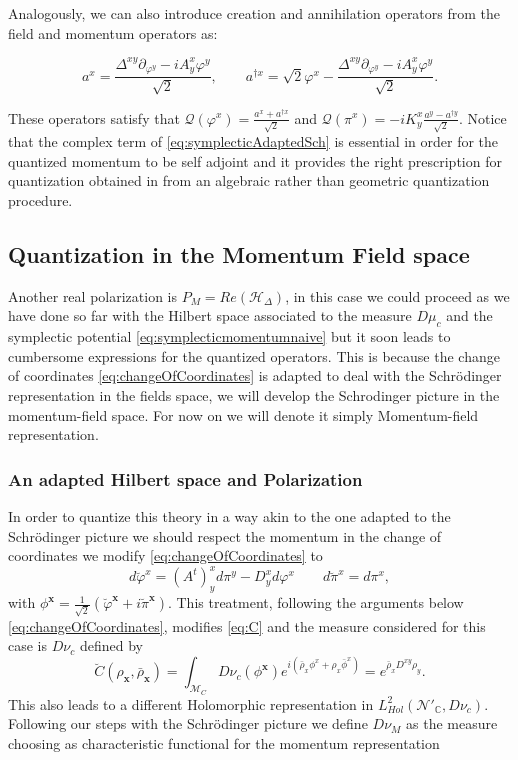 \documentclass[12pt]{article}%
\begin{document}
Analogously, we can also introduce creation and annihilation operators from the field and momentum operators as:

\begin{equation}
\label{eq:crationannihilation}
a^x= \frac{\Delta^{xy}\partial_{\varphi^y}-iA^x_{y}\varphi^y}{\sqrt{2}}, \qquad a^{\dagger x}=\sqrt{2}\varphi^x-\frac{\Delta^{xy}\partial_{\varphi^y}-iA^x_{y}\varphi^y}{\sqrt{2}}.
\end{equation}

These operators satisfy that  $\mathcal{Q}(\varphi^x)= \frac{a^x+a^{\dagger x}}{\sqrt2}$ and $\mathcal{Q}(\pi^x)= -iK^x_{y}\frac{a^y-a^{\dagger y}}{\sqrt2}$.
Notice that the complex term of \eqref{eq:symplecticAdaptedSch} is essential in order for the quantized momentum to be self adjoint  and it provides the right prescription for quantization   
 obtained in \cite{Corichi2004} from an algebraic rather than geometric quantization procedure. 
\subsection{Quantization in the Momentum Field space}
Another real polarization is $P_M=Re(\mathcal{H}_\Delta)$, in this case we could proceed as we have done so far with the Hilbert space associated to the measure $D\mu_c$ and the symplectic potential \eqref{eq:symplecticmomentumnaive} but it soon leads to cumbersome expressions for the quantized operators. This is because the change of coordinates \eqref{eq:changeOfCoordinates} is adapted to deal with the Schrödinger representation in the fields space, we will develop the Schrodinger picture in the momentum-field space. For now on we will denote it simply Momentum-field representation.  
\subsubsection{An adapted Hilbert space and Polarization }
 In order to quantize this theory in a way akin to the one adapted to the Schrödinger picture we should respect the momentum in the change of coordinates we modify  \eqref{eq:changeOfCoordinates}  to  
$$d{\breve{\varphi}^x}=(A^t)^x_yd\pi^y-D^x_yd{\varphi^x} \qquad{d\breve{\pi}^x}=d{\pi^x},$$
with $\phi^\mathbf{x}=\frac{1}{\sqrt2}(\breve\varphi^\mathbf{x}+i\breve\pi^\mathbf{x})$. This treatment, following the arguments below  \eqref{eq:changeOfCoordinates}, modifies \eqref{eq:C} and  the measure considered for this case is $D\nu_c$ defined by
\begin{equation}
    \label{eq:gaussianmeasuremomentum}
    \breve{C}(\rho_{\mathbf{x}}, \bar \rho_{\mathbf{x}})=\int_{\mathcal{M}_C}D\nu_c(\phi^\mathbf{x} )e^{i (\bar\rho_x\phi^x+\rho_x\bar \phi^x) }= e^{\bar\rho_xD^{xy}\rho_y }.
\end{equation}
This also leads to a different Holomorphic representation in $L^2_{Hol}(\mathcal{N}'_{\mathbb{C}},D\nu_c)$. 
Following our steps with the Schrödinger picture we define $D\nu_M$ as the measure choosing as characteristic functional for the momentum representation 
\end{document}
